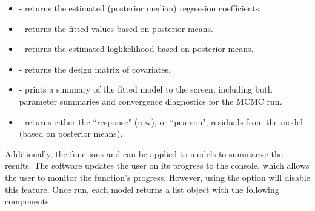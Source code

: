 \documentclass[article, nojss]{jss}
\begin{document}
\begin{itemize}
\item {} - returns the estimated (posterior median) regression coefficients. 
\item {} - returns the fitted values based on posterior means.
\item {} - returns the estimated loglikelihood based on posterior means.
\item {} - returns the design matrix of covariates.
\item {} - prints a summary of the fitted model to the screen, including both parameter summaries and convergence diagnostics for the MCMC run.
\item {} - returns either the ``response" (raw), or ``pearson", residuals from the model (based on posterior means).
\end{itemize}

Additionally, the  functions  and  can  be applied to  models to summarise the results. The software updates the user on its progress to the  console, which allows the user to monitor the function's progress. However, using the  option will disable this feature. Once run, each model returns a list object with the following components. 
\end{document}
